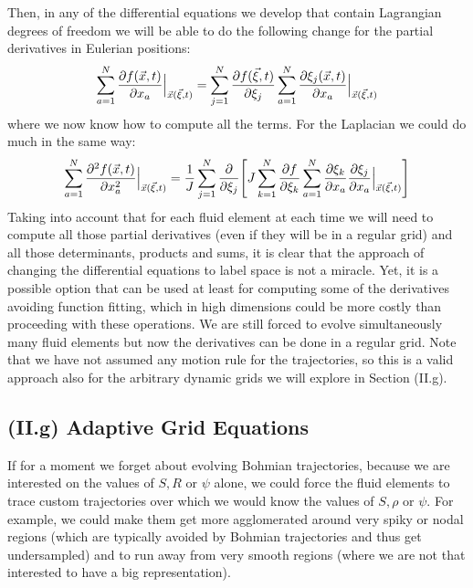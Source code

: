 \documentclass[11pt, a4paper]{article} %
\begin{document}
Then, in any of the differential equations we develop that contain Lagrangian degrees of freedom we will be able to do the following change for the partial derivatives in Eulerian positions:
\begin{equation}
\sum_{a=1}^N \pdv{f(\vec{x},t)}{x_a}\Big\rvert_{\vec{x}(\vec{\xi},t)} = \sum_{j=1}^N \pdv{f(\vec{\xi},t)}{\xi_j} \sum_{a=1}^N \pdv{\xi_j(\vec{x},t)}{x_a}\Big\rvert_{\vec{x}(\vec{\xi},t)}
\end{equation}
where we now know how to compute all the terms. For the Laplacian we could do much in the same way:
\begin{equation}
\sum_{a=1}^N \pdv[2]{f(\vec{x},t)}{x_a}\Big\rvert_{\vec{x}(\vec{\xi},t)}=\frac{1}{J} \sum_{j=1}^N\pdv{}{\xi_j} \qty[ J\sum_{k=1}^N\pdv{f}{\xi_k}\sum_{a=1}^N\pdv{\xi_k}{x_a}\pdv{\xi_j}{x_a}\Big\rvert_{\vec{x}(\vec{\xi},t)}]
\end{equation}
Taking into account that for each fluid element at each time we will need to compute all those partial derivatives (even if they will be in a regular grid) and all those determinants, products and sums, it is clear that the approach of changing the differential equations to label space is not a miracle. Yet, it is a possible option that can be used at least for computing some of the derivatives avoiding function fitting, which in high dimensions could be more costly than proceeding with these operations. We are still forced to evolve simultaneously many fluid elements but now the derivatives can be done in a regular grid. Note that we have not assumed any motion rule for the trajectories, so this is a valid approach also for the arbitrary dynamic grids we will explore in Section (II.g).


\subsection*{(II.g) Adaptive Grid Equations}

If for a moment we forget about evolving Bohmian trajectories, because we are interested on the values of $S,R$ or $\psi$ alone, we could force the fluid elements to trace custom trajectories over which we would know the values of $S,\rho$ or $\psi$. For example, we could make them get more agglomerated around very spiky or nodal regions (which are typically avoided by Bohmian trajectories and thus get undersampled) and to run away from very smooth regions (where we are not that interested to have a big representation).
\end{document}
